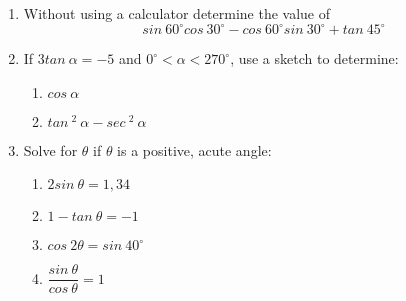 \begin{eocexercises}{}

\begin{enumerate}[itemsep=6pt, label=\textbf{\arabic*}. ] 
\item Without using a calculator determine the value of 
\begin{equation*}
sin~ 60^{\circ} cos~ 30^{\circ}-cos~ 60^{\circ}sin~ 30^{\circ} + tan~ 45^{\circ}
\end{equation*}
\item If $3 tan~ \alpha = -5$ and $0^{\circ} < \alpha < 270^{\circ}$, use a sketch to determine:
    \begin{enumerate}[noitemsep, label=\textbf{(\alph*)} ]
    \item $cos~ \alpha$
    \item $tan~^{2}~\alpha - sec~^{2}~\alpha$
    \end{enumerate}
\item Solve for $\theta$ if $\theta$ is a positive, acute angle:
    \begin{enumerate}[noitemsep, label=\textbf{(\alph*)} ]
    \item $2 sin~ \theta = 1,34$
    \item $1 - tan~ \theta = -1$
    \item $cos~ 2\theta = sin~ 40^{\circ}$ 
    \item $\dfrac{sin~ \theta}{cos~ \theta}= 1$
    \end{enumerate}



\end{enumerate}
\end{eocexercises}
